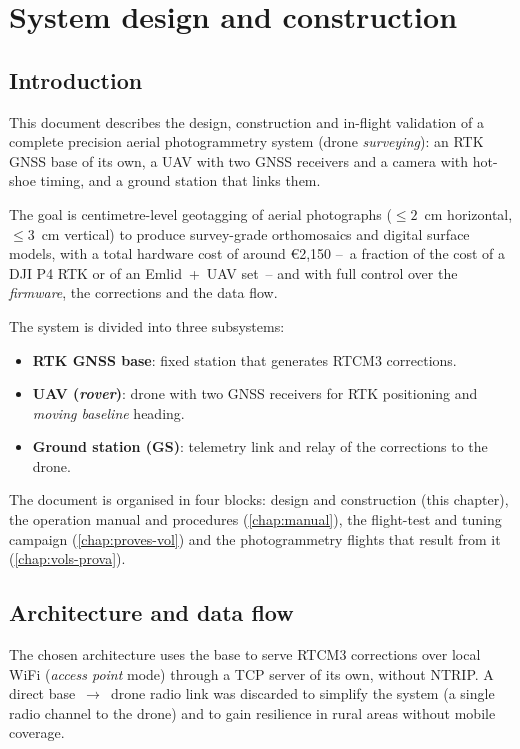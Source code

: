 \chapter{System design and construction}
\label{chap:construccio}

\section{Introduction}
\label{sec:introduccio}

This document describes the design, construction and in-flight validation of a complete precision aerial photogrammetry system (drone \emph{surveying}): an RTK GNSS base of its own, a UAV with two GNSS receivers and a camera with hot-shoe timing, and a ground station that links them.

The goal is centimetre-level geotagging of aerial photographs ($\leq 2$~cm horizontal, $\leq 3$~cm vertical) to produce survey-grade orthomosaics and digital surface models, with a total hardware cost of around €2,150 --~a fraction of the cost of a DJI P4 RTK or of an Emlid~+~UAV set~-- and with full control over the \emph{firmware}, the corrections and the data flow.

The system is divided into three subsystems:
\begin{itemize}
    \item \textbf{RTK GNSS base}: fixed station that generates RTCM3 corrections.
    \item \textbf{UAV (\emph{rover})}: drone with two GNSS receivers for RTK positioning and \emph{moving baseline} heading.
    \item \textbf{Ground station (GS)}: telemetry link and relay of the corrections to the drone.
\end{itemize}

The document is organised in four blocks: design and construction (this chapter), the operation manual and procedures (\cref{chap:manual}), the flight-test and tuning campaign (\cref{chap:proves-vol}) and the photogrammetry flights that result from it (\cref{chap:vols-prova}).

\section{Architecture and data flow}
\label{sec:arquitectura}

The chosen architecture uses the base to serve RTCM3 corrections over local WiFi (\emph{access point} mode) through a TCP server of its own, without NTRIP. A direct base~$\rightarrow$~drone radio link was discarded to simplify the system (a single radio channel to the drone) and to gain resilience in rural areas without mobile coverage.

